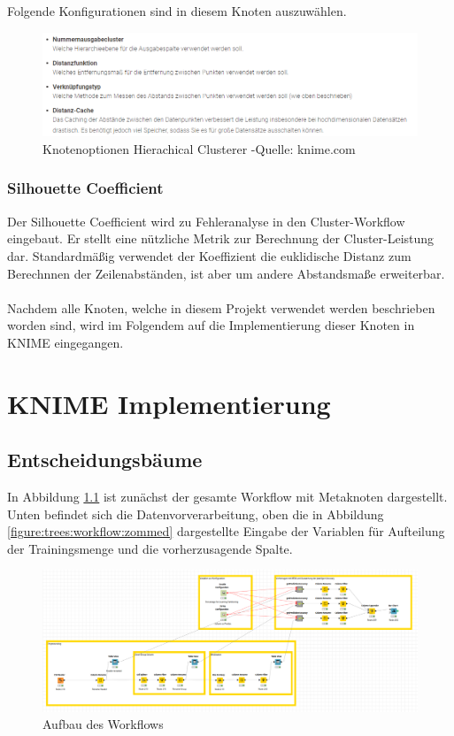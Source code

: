 \documentclass[12pt,					%
							 oneside,			%
							 a4paper,			%
							 halfparskip,		%
							 liststotoc,			%
							 bibtotoc,			%
							 fleqn,				%
							 pointlessnumbers]	%
							 {scrreprt}
\begin{document}
		Folgende Konfigurationen sind in diesem Knoten auszuwählen.
		\begin{figure}[h]
			\begin{center}
				\includegraphics[scale=0.7]{pictures/hier-opt.png}
				\caption{Knotenoptionen Hierachical Clusterer -Quelle: knime.com}									
			\end{center}
		\end{figure}
		
		\subsection{Silhouette Coefficient}
		Der Silhouette Coefficient wird zu Fehleranalyse in den Cluster-Workflow eingebaut. Er stellt eine nützliche Metrik zur Berechnung der Cluster-Leistung dar. Standardmäßig verwendet der Koeffizient die euklidische Distanz zum Berechnnen der Zeilenabständen, ist aber um andere Abstandsmaße erweiterbar.  \\ \\

Nachdem alle Knoten, welche in diesem Projekt verwendet werden beschrieben worden sind, wird im Folgendem auf die Implementierung dieser Knoten in KNIME eingegangen.
\chapter{KNIME Implementierung}

	\section{Entscheidungsbäume}
		In Abbildung \ref{figure:trees:workflow} ist zunächst der gesamte Workflow mit Metaknoten dargestellt. Unten befindet sich die Datenvorverarbeitung, oben die in Abbildung \ref{figure:trees:workflow:zommed} dargestellte Eingabe der Variablen für Aufteilung der Trainingsmenge und die vorherzusagende Spalte.
				
		\begin{figure}[h]
			\begin{center}
				\includegraphics[scale=0.3]{pictures/trees-workflow-gesamt.png}
				\caption{Aufbau des Workflows}									
				\label{figure:trees:workflow}
			\end{center}
		\end{figure}
		
\end{document}
